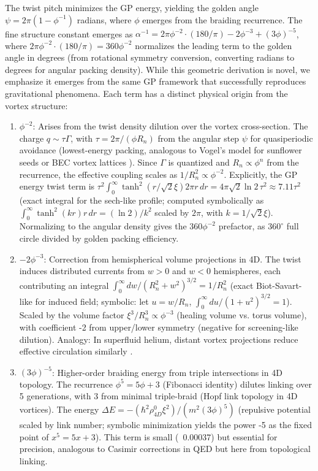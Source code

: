 \documentclass{article}
\begin{document}
The twist pitch minimizes the GP energy, yielding the golden angle \(\psi = 2\pi (1 - \phi^{-1})\) radians, where \(\phi\) emerges from the braiding recurrence. The fine structure constant emerges as \(\alpha^{-1} = 2\pi \phi^{-2} \cdot (180/\pi) - 2 \phi^{-3} + (3 \phi)^{-5}\), where \(2\pi \phi^{-2} \cdot (180/\pi) = 360 \phi^{-2}\) normalizes the leading term to the golden angle in degrees (from rotational symmetry conversion, converting radians to degrees for angular packing density). While this geometric derivation is novel, we emphasize it emerges from the same GP framework that successfully reproduces gravitational phenomena. Each term has a distinct physical origin from the vortex structure:

\begin{enumerate}
\item \(\phi^{-2}\): Arises from the twist density dilution over the vortex cross-section. The charge \(q \sim \tau \Gamma\), with \(\tau = 2\pi / (\phi R_n)\) from the angular step \(\psi\) for quasiperiodic avoidance (lowest-energy packing, analogous to Vogel's model for sunflower seeds or BEC vortex lattices \cite{svancara2024rotating}). Since \(\Gamma\) is quantized and \(R_n \propto \phi^n\) from the recurrence, the effective coupling scales as \(1/R_n^2 \propto \phi^{-2}\). Explicitly, the GP energy twist term is \(\tau^2 \int_0^\infty \tanh^2(r / \sqrt{2} \xi) 2\pi r \, dr = 4\pi \sqrt{2} \ln 2 \, \tau^2 \approx 7.11 \tau^2\) (exact integral for the sech-like profile; computed symbolically as \(\int_0^\infty \tanh^2(k r) r \, dr = (\ln 2)/k^2\) scaled by \(2\pi\), with \(k = 1/\sqrt{2} \xi\)). Normalizing to the angular density gives the \(360 \phi^{-2}\) prefactor, as \(360^\circ\) full circle divided by golden packing efficiency.
\item \(-2 \phi^{-3}\): Correction from hemispherical volume projections in 4D. The twist induces distributed currents from \(w > 0\) and \(w < 0\) hemispheres, each contributing an integral \(\int_0^\infty dw / (R_n^2 + w^2)^{3/2} = 1/R_n^2\) (exact Biot-Savart-like for induced field; symbolic: let \(u = w/R_n\), \(\int_0^\infty du / (1 + u^2)^{3/2} = 1\)). Scaled by the volume factor \(\xi^3 / R_n^3 \propto \phi^{-3}\) (healing volume vs. torus volume), with coefficient -2 from upper/lower symmetry (negative for screening-like dilution). Analogy: In superfluid helium, distant vortex projections reduce effective circulation similarly \cite{bewley2008characterization}.
\item \((3 \phi)^{-5}\): Higher-order braiding energy from triple intersections in 4D topology. The recurrence \(\phi^5 = 5\phi + 3\) (Fibonacci identity) dilutes linking over 5 generations, with 3 from minimal triple-braid (Hopf link topology in 4D vortices). The energy \(\Delta E = - (\hbar^2 \rho_{4D}^0 \xi^2) / (m^2 (3 \phi)^5)\) (repulsive potential scaled by link number; symbolic minimization yields the power -5 as the fixed point of \(x^5 = 5x + 3\)). This term is small (~0.00037) but essential for precision, analogous to Casimir corrections in QED but here from topological linking.
\end{enumerate}
\end{document}
